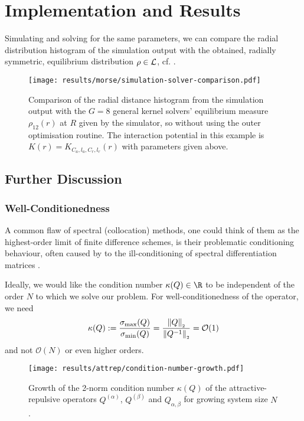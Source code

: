 \chapter{Implementation and Results}
\label{chap:implementation-and-results}

Simulating and solving for the same parameters, we can compare the radial distribution histogram of the simulation output with the obtained, radially symmetric, equilibrium distribution $\rho \in \mathcal{L}$, cf. .


\begin{figure}[H]
  \centering
  \texttt{[image: results/morse/simulation-solver-comparison.pdf]}
  \caption[Comparison of histogram and spectral method solution]{Comparison of the radial distance histogram from the simulation output with the $G = 8$ general kernel solvers' equilibrium measure $\rho_{12}(r)$ at $R$ given by the simulator, so without using the outer optimisation routine. The interaction potential in this example is $K(r) = K_{C_a, l_a, C_r, l_r}(r)$ with parameters given above.}
  \label{fig:simulation-solver-comparison}
\end{figure}

\section{Further Discussion}
\subsection{Well-Conditionedness}
A common flaw of spectral (collocation) methods, one could think of them as the highest-order limit of finite difference schemes, is their problematic conditioning behaviour, often caused by to the ill-conditioning of spectral differentiation matrices \parencite{2019-atap}.

Ideally, we would like the condition number $\kappa(Q) \in \R$ to be independent of the order $N$ to which we solve our problem.
For well-conditionedness of the operator, we need
$$\kappa(Q) := \frac{\sigma_{\rm max}(Q)}{\sigma_{\rm min}(Q)} = \frac{\left\lVert Q\right\rVert_{\scriptscriptstyle 2}}{\left\lVert Q^{-1}\right\rVert_{\scriptscriptstyle 2}} = \mathcal{O}(1)$$
and not $\mathcal{O}(N)$ or even higher orders.

\begin{figure}[H]
  \centering
  \texttt{[image: results/attrep/condition-number-growth.pdf]}
  \caption[Growth of the condition number]{Growth of the 2-norm condition number $\kappa(Q)$ of the attractive-repulsive operators $Q^{(\alpha)}$, $Q^{(\beta)}$ and $Q_{\alpha,\beta}$ for growing system size $N$.}
  \label{fig:condition-number-growth}
\end{figure}

